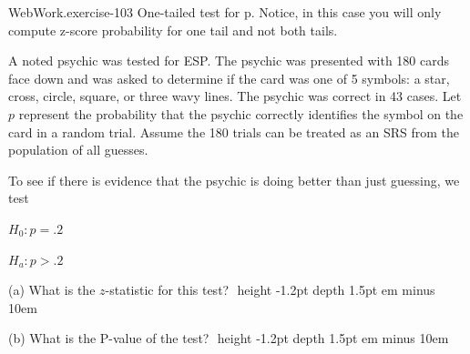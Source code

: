 \documentclass[10pt,]{book}
\newcommand{\fillin}[1]{\leavevmode\leaders\vrule height -1.2pt depth 1.5pt \hskip #1em minus #1em \null}
\numberwithin{equation}{section}
\begin{document}
%
\par
\hypertarget{p-1454}{}%
\begin{inlineexercise}{WebWork.}{exercise-103}%
\hypertarget{p-1455}{}%
One-tailed test for p. Notice, in this case you will only compute z-score probability for one tail and not both tails.%
\par\medskip
\hypertarget{p-1456}{}%
A noted psychic was tested for ESP.  The psychic was presented with 180 cards face down and was asked to determine if the card was one of 5 symbols: a star, cross, circle, square, or three wavy lines.  The psychic was correct in 43 cases.  Let \(p\) represent the probability that the psychic correctly identifies the symbol on the card in a random trial. Assume the 180 trials can be treated as an SRS from the population of all guesses.%
\par
\hypertarget{p-1457}{}%
To see if there is evidence that the psychic is doing better than just guessing, we test%
\par
\hypertarget{p-1458}{}%
\(H_0: p = .2\)%
\par
\hypertarget{p-1459}{}%
\(H_a: p > .2\)%
\par
\hypertarget{p-1460}{}%
(a) What is the \(z\)-statistic for this test? \(\)  \fillin{10}%
\par
\hypertarget{p-1461}{}%
(b) What is the P-value of the test?  \(\)  \fillin{10}%
\end{inlineexercise}
%
%
%
\typeout{************************************************}
\typeout{************************************************}
%
\end{document}
